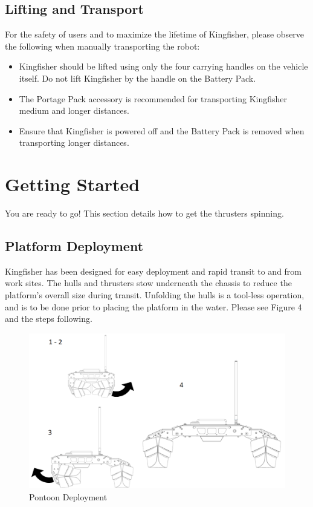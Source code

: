 \documentclass[]{clearpath-latex/clearpath-manual}
\begin{document}
\subsection{Lifting and Transport}
For the safety of users and to maximize the lifetime of Kingfisher, please observe the following when manually transporting the robot:

\begin{itemize}[nolistsep]
	\item Kingfisher should be lifted using only the four carrying handles on the vehicle itself. Do not lift Kingfisher by the handle on the Battery Pack.
	\item The Portage Pack accessory is recommended for transporting Kingfisher medium and longer distances.
	\item Ensure that Kingfisher is powered off and the Battery Pack is removed when transporting longer distances.
\end{itemize}

\newpage

\section{Getting Started}
You are ready to go! This section details how to get the thrusters spinning.

\subsection{Platform Deployment}
Kingfisher has been designed for easy deployment and rapid transit to and from work sites. The hulls and thrusters stow underneath the chassis to reduce the platform's overall size during transit. Unfolding the hulls is a tool-less operation, and is to be done prior to placing the platform in the water. Please see Figure 4 and the steps following.

\begin{figure}[h]
  \centering
  \includegraphics[width=0.75\linewidth]{kf_pontoon.PNG}
  \caption{Pontoon Deployment}
  \label{kf_pontoon}
\end{figure}
\end{document}
